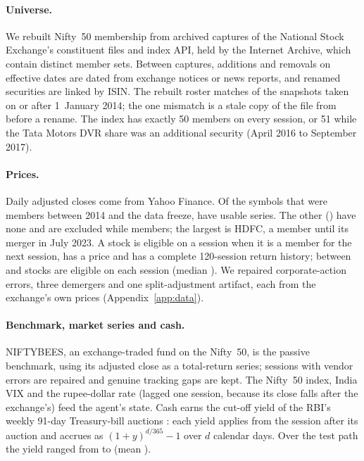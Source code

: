 \documentclass[11pt]{article}
\begin{document}
\paragraph{Universe.} We rebuilt Nifty~50 membership from \NCaptures{} archived captures of the National Stock Exchange's constituent files and index API, held by the Internet Archive, which contain \NMemberSets{} distinct member sets. Between captures, \NChanges{} additions and removals on \NChangeDates{} effective dates are dated from exchange notices or news reports, and renamed securities are linked by ISIN. The rebuilt roster matches \NSnapMatch{} of the \NSnap{} snapshots taken on or after 1~January 2014; the one mismatch is a stale copy of the file from before a rename. The index has exactly 50 members on every session, or 51 while the Tata Motors DVR share was an additional security (April 2016 to September 2017).

\paragraph{Prices.} Daily adjusted closes come from Yahoo Finance. Of the \NSymbols{} symbols that were members between 2014 and the data freeze, \NPriced{} have usable series. The other \NExcluded{} (\ExcludedList) have none and are excluded while members; the largest is HDFC, a member until its merger in July 2023. A stock is eligible on a session when it is a member for the next session, has a price and has a complete 120-session return history; between \EligMin{} and \EligMax{} stocks are eligible on each session (median \EligMed{}). We repaired \NRepairs{} corporate-action errors, three demergers and one split-adjustment artifact, each from the exchange's own prices (Appendix~\ref{app:data}).

\paragraph{Benchmark, market series and cash.} NIFTYBEES, an exchange-traded fund on the Nifty~50, is the passive benchmark, using its adjusted close as a total-return series; \NBenchRepairs{} sessions with vendor errors are repaired and \NBenchGaps{} genuine tracking gaps are kept. The Nifty~50 index, India VIX and the rupee-dollar rate (lagged one session, because its close falls after the exchange's) feed the agent's state. Cash earns the cut-off yield of the RBI's weekly 91-day Treasury-bill auctions \citep{rbi91}: each yield applies from the session after its auction and accrues as $(1+y)^{d/365}-1$ over $d$ calendar days. Over the test path the yield ranged from \RfMin{} to \RfMax{} (mean \RfMean{}).
\end{document}
